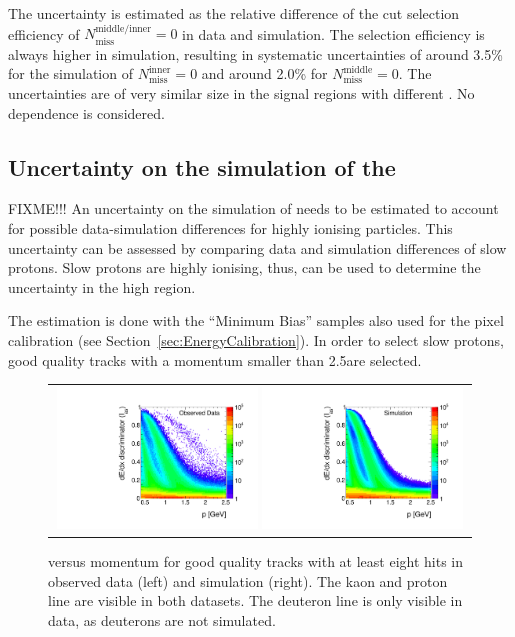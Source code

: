 The uncertainty is estimated as the relative difference of the cut selection efficiency of $N_{\text{miss}}^{\text{middle/inner}}=0$ in data and simulation.
The selection efficiency is always higher in simulation, resulting in systematic uncertainties of around 3.5\% for the simulation of $N_{\text{miss}}^{\text{inner}}=0$ and around 2.0\% for $N_{\text{miss}}^{\text{middle}}=0$.
The uncertainties are of very similar size in the signal regions with different \pt.
No \ias dependence is considered.

\subsection*{Uncertainty on the simulation of the \ias}
FIXME!!!
An uncertainty on the simulation of \ias needs to be estimated to account for possible data-simulation differences for highly ionising particles.
This uncertainty can be assessed by comparing data and simulation differences of slow protons.
Slow protons are highly ionising, thus, can be used to determine the uncertainty in the high \ias region.

The estimation is done with the ``Minimum Bias'' samples also used for the pixel calibration (see Section~\ref{sec:EnergyCalibration}).
In order to select slow protons, good quality tracks with a momentum smaller than 2.5\gev are selected.
\begin{figure}[!h]
  \centering 
  \begin{tabular}{c}
    \includegraphics[width=0.49\textwidth]{figures/analysis/Interpretation/IasP_Data.pdf} 
    \includegraphics[width=0.49\textwidth]{figures/analysis/Interpretation/IasP_MC.pdf}
  \end{tabular}
  \caption{\ias versus momentum for good quality tracks with at least eight hits in observed data (left) and simulation (right).
           The kaon and proton line are visible in both datasets. The deuteron line is only visible in data, as deuterons are not simulated.}
  \label{fig:optimisation}
\end{figure} 

